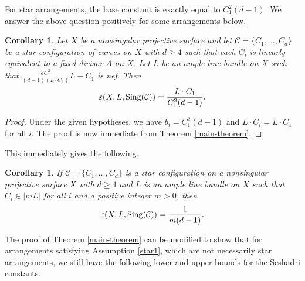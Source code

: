 \documentclass[12pt,reqno]{amsart}
\theoremstyle{plain}
\numberwithin{equation}{section}
\newtheorem{corollary}[theorem]{Corollary}
\theoremstyle{definition}
\begin{document}
	For star arrangements, the base constant is exactly equal to $C_1^2(d-1)$. We answer the above question positively for some arrangements below.  
 



 
	
	\begin{corollary}
		\label{prop:star} Let $X$ be a nonsingular projective surface and let $\mathcal{C} = \{C_{1}, \ldots, C_{d}\}$ be a star configuration of curves on $X$ with $d \geq 4$ such that each $ C_i$ is linearly equivalent to a fixed divisor $A$ on $X$. Let $L$ be an ample line bundle on $X$
		such that  $\frac{dC_1^2}{(d-1)(L\cdot C_1)}L-C_1$ is nef.   Then 
		$$\varepsilon(X, L,{\rm Sing}(\mathcal{C})) = \frac{L\cdot C_1}{C_1^2(d-1)}.$$
	\end{corollary}

 \begin{proof}
Under the given hypotheses, we have $b_i = C_1^2(d-1)$  and $L\cdot C_i = L\cdot C_1$
for all $i$. 
The proof is now immediate from Theorem \ref{main-theorem}.    
 \end{proof} This immediately gives the following. 


	\begin{corollary}
		\label{coro:star}
		If $\mathcal{C} = \{C_{1}, \ldots, C_{d}\}$ is a star configuration on a nonsingular projective surface $X$ with $d \geq 4$  and $L$ is an ample line bundle  on $X$ such that $ C_i \in |mL|$ for all $i$ and a positive integer $m>0$, then 
		$$\varepsilon(X, L,{\rm Sing}(\mathcal{C})) = \frac{1}{m(d-1)}.$$
	\end{corollary}




The proof of Theorem \ref{main-theorem} can be modified to show that for arrangements
satisfying Assumption \ref{star1}, which are not necessarily star arrangements, we still have the following lower and upper bounds for the Seshadri constants. 
\end{document}
